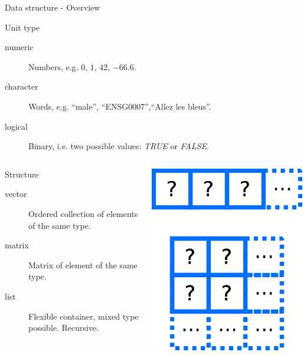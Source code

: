 \documentclass[10pt]{beamer}
\begin{document}
\begin{frame}{Data structure - Overview}
  \begin{block}{Unit type}
    \begin{description}
      \item[numeric] Numbers, e.g. $0$, $1$, $42$, $-66.6$.
      \item[character] Words, e.g. ``male'', ``ENSG0007'',``Allez les bleus''.
      \item[logical] Binary, i.e. two possible values: {\it TRUE} or {\it FALSE}.
    \end{description}
  \end{block}
  \begin{columns}
    \begin{column}{.8\textwidth}
      \begin{block}{Structure}
        \begin{description}
        \item[vector] Ordered collection of elements of the same type.
        \item[matrix] Matrix of element of the same type.
        \item[list] Flexible container, mixed type possible. Recursive.
        \end{description}
      \end{block}      
    \end{column}
    \begin{column}{.2\textwidth}
      \includegraphics[width=\linewidth]{../imgs/vectorMatrixCartoon.png}

\end{column}
\end{columns}
\end{frame}
\end{document}
